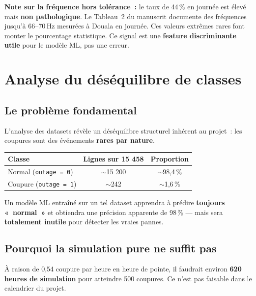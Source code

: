 \documentclass[12pt,a4paper]{article}
\begin{document}
\begin{mdframed}[style=warn]
\textbf{Note sur la fréquence hors tolérance~:} le taux de 44\,\%
en journée est élevé mais \textbf{non pathologique}. Le Tableau~2
du manuscrit documente des fréquences jusqu'à 66–70\,Hz mesurées
à Douala en journée. Ces valeurs extrêmes rares font monter le
pourcentage statistique. Ce signal est une \textbf{feature
discriminante utile} pour le modèle ML, pas une erreur.
\end{mdframed}

\section{Analyse du déséquilibre de classes}
\label{sec:desequilibre}

\subsection{Le problème fondamental}

L'analyse des datasets révèle un déséquilibre structurel inhérent
au projet~: les coupures sont des événements \textbf{rares par nature}.

\begin{center}
\begin{tabular}{lcc}
\toprule
\textbf{Classe} & \textbf{Lignes sur 15 458} & \textbf{Proportion} \\
\midrule
Normal (\texttt{outage = 0}) & $\sim$15 200 & $\sim$98{,}4\,\% \\
Coupure (\texttt{outage = 1}) & $\sim$242   & $\sim$1{,}6\,\% \\
\bottomrule
\end{tabular}
\end{center}

Un modèle ML entraîné sur un tel dataset apprendra à prédire
\textbf{toujours «~normal~»} et obtiendra une précision
apparente de 98\,\% — mais sera \textbf{totalement inutile} pour
détecter les vraies pannes.

\subsection{Pourquoi la simulation pure ne suffit pas}

À raison de 0{,}54 coupure par heure en heure de pointe, il faudrait
environ \textbf{620 heures de simulation} pour atteindre 500 coupures.
Ce n'est pas faisable dans le calendrier du projet.
\end{document}

